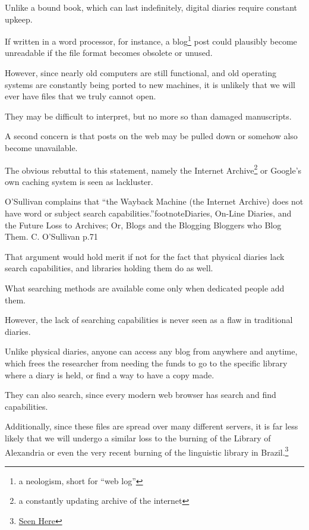 \documentclass[12pt]{article}[titlepage]
\newcommand{\say}[1]{``#1''}
\newcommand{\1}{\={a}}
\newcommand{\2}{\={e}}
\newcommand{\3}{\={\i}}
\newcommand{\4}{\=o}
\newcommand{\5}{\=u}
\newcommand{\6}{\={A}}
\renewcommand{\,}{\textsuperscript{,}}
\begin{document}
Unlike a bound book, which can last indefinitely, digital diaries require constant upkeep.

If written in a word processor, for instance, a blog\footnote{a neologism, short for \say{web log}} post could plausibly become unreadable if the file format becomes obsolete or unused.

However, since nearly old computers are still functional, and old operating systems are constantly being ported to new machines, it is unlikely that we will ever have files that we truly cannot open.

They may be difficult to interpret, but no more so than damaged manuscripts.


A second concern is that posts on the web may be pulled down or somehow also become unavailable.

The obvious rebuttal to this statement, namely the Internet Archive\footnote{a constantly updating archive of the internet} or Google’s own caching system is seen as lackluster.

O’Sullivan complains that \say{the Wayback Machine (the Internet Archive) does not have word or subject search capabilities.}footnote{Diaries, On-Line Diaries, and the Future Loss to Archives; Or, Blogs and the Blogging Bloggers who Blog Them. C. O’Sullivan p.71}

That argument would hold merit if not for the fact that physical diaries lack search capabilities, and libraries holding them do as well.

What searching methods are available come only when dedicated people add them.


However, the lack of searching capabilities is never seen as a flaw in traditional diaries.

Unlike physical diaries, anyone can access any blog from anywhere and anytime, which frees the researcher from needing the funds to go to the specific library where a diary is held, or find a way to have a copy made.

They can also search, since every modern web browser has search and find capabilities.


Additionally, since these files are spread over many different servers, it is far less likely that we will undergo a similar loss to the burning of the Library of Alexandria or even the very recent burning of the linguistic library in Brazil.\footnote{\href{https://www.nationalgeographic.com/science/2018/09/news-museu-nacional-fire-rio-de-janeiro-natural-history/}{Seen Here}}
\end{document}
